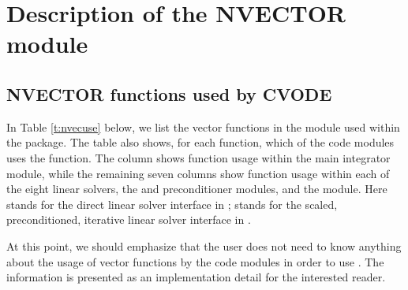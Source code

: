 \chapter{Description of the NVECTOR module}\label{s:nvector}



\section{NVECTOR functions used by CVODE}

In Table \ref{t:nvecuse} below, we list the vector functions in the 
{\nvector} module used within the {\cvode} package.
The table also shows, for each function, which of the code modules uses
the function. The {\cvode} column shows function usage within the main
integrator module, while the remaining seven columns show function usage
within each of the eight {\cvode} linear solvers, the {\cvbandpre} and
{\cvbbdpre} preconditioner modules, and the {\fcvode} module.  Here
{\cvdls} stands for the direct linear solver interface in {\cvode};
{\cvspils} stands for the scaled, preconditioned, iterative linear
solver interface in {\cvode}.

At this point, we should emphasize that the {\cvode} user does not need to know 
anything about the usage of vector functions by the {\cvode} code modules in order 
to use {\cvode}. The information is presented as an implementation detail for the 
interested reader.


